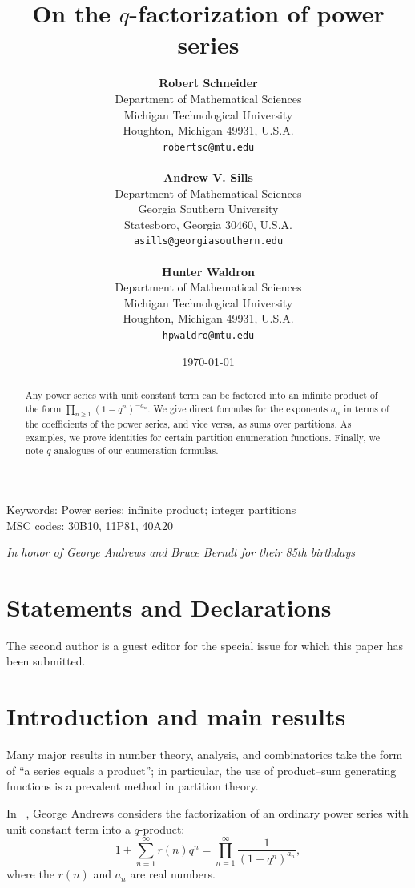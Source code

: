 \documentclass[10pt]{article}
\title{On the $q$-factorization of power series}
\author{
\textbf{Robert Schneider}\\ Department of Mathematical Sciences\\
Michigan Technological University\\
Houghton, Michigan 49931, U.S.A.\\
\texttt{robertsc@mtu.edu} \\ \\
 \textbf{Andrew V. Sills} \\Department of Mathematical Sciences\\
 Georgia Southern University\\
Statesboro, Georgia 30460, U.S.A.\\
\texttt{asills@georgiasouthern.edu}\\ \\
\textbf{Hunter Waldron}\\
Department of Mathematical Sciences\\
Michigan Technological University\\
Houghton, Michigan 49931, U.S.A.\\
\texttt{hpwaldro@mtu.edu} 
}
\date{\today}
\theoremstyle{definition}
\numberwithin{theorem}{section}
\numberwithin{equation}{section}
\begin{document}
\maketitle

Keywords: {Power series; infinite product; integer partitions}\\
MSC codes: 30B10, 11P81, 40A20

\begin{abstract}
Any power series with unit constant term can be factored into an infinite product of the
form $\prod_{n\geq 1} (1-q^n)^{-a_n}$.   We give direct formulas for the exponents $a_n$ 
in terms of the coefficients of the power series, and vice versa, as sums over partitions.
As examples, we prove identities for certain partition enumeration functions.  Finally, we note $q$-analogues of our enumeration formulas.
\end{abstract}





\begin{center} {\it In honor of George Andrews and Bruce  Berndt for their 85th birthdays}\end{center}

\section*{Statements and Declarations}
The second author is a guest editor for the special issue for which this paper has been
submitted.

\section{Introduction and main results}
Many major results in number theory, analysis, and combinatorics take the form of ``a series equals a product''; in particular, the use of product--sum generating functions is a prevalent method in partition theory. 

In ~\cite[p. 98, Ex. 2]{gea76}, George Andrews considers the factorization of an ordinary power series 
with unit constant term into a $q$-product:
\begin{equation} \label{ps}
  1 + \sum_{n=1}^\infty r(n) q^n = \prod_{n=1}^\infty \frac{1}{(1-q^n)^{a_n}},
\end{equation} where the $r(n)$ and $a_n$ are real numbers.
\end{document}
